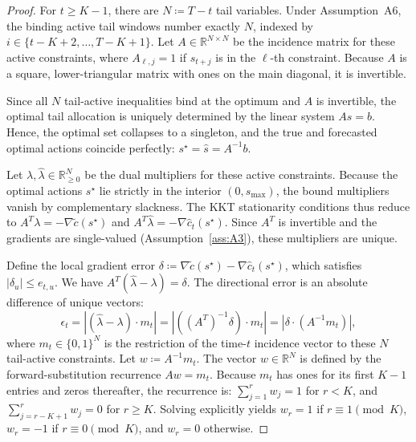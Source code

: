 \documentclass[11pt]{article}
\newcommand{\R}{\mathbb{R}}
\newcommand{\1}{\mathbf{1}}
\newcommand{\eqdef}{\coloneqq}
\newcommand{\modu}[1]{\left|#1\right|}
\begin{document}
\begin{proof}
  For $t \geq K-1$, there are $N \eqdef T-t$ tail variables.
  Under Assumption~A6, the binding active tail windows number exactly $N$, indexed by $i \in \{t-K+2,\dots,T-K+1\}$. Let $A \in \R^{N \times N}$ be the incidence matrix for these active constraints, where $A_{\ell,j} = 1$ if $s_{t+j}$ is in the $\ell$-th constraint.
  Because $A$ is a square, lower-triangular matrix with ones on the main diagonal, it is invertible.

  Since all $N$ tail-active inequalities bind at the optimum and $A$ is invertible, the optimal tail allocation is uniquely determined by the linear system $A s = b$. Hence, the optimal set collapses to a singleton, and the true and forecasted optimal actions coincide perfectly: $s^\star = \hat{s} = A^{-1}b$.

  Let $\lambda, \hat{\lambda} \in \R_{\ge 0}^N$ be the dual multipliers for these active constraints. Because the optimal actions $s^\star$ lie strictly in the interior $(0, s_{\max})$, the bound multipliers vanish by complementary slackness.
  The KKT stationarity conditions thus reduce to $A^T \lambda = -\nabla \tilde{c}(s^{\star})$ and $A^T \hat{\lambda} = -\nabla \hat{c}_{t}(s^{\star})$. Since $A^T$ is invertible and the gradients are single-valued (Assumption~\ref{ass:A3}), these multipliers are unique.

  Define the local gradient error $\delta \eqdef \nabla \tilde{c}(s^{\star}) - \nabla \hat{c}_{t}(s^{\star})$, which satisfies $|\delta_u| \le e_{t,u}$. We have $A^T(\hat{\lambda} - \lambda) = \delta$.
  The directional error is an absolute difference of unique vectors:
  \begin{equation*}
    \epsilon_t = \modu{ (\hat{\lambda} - \lambda) \cdot m_t } = \modu{ ((A^{T})^{-1}\delta) \cdot m_t } = \modu{ \delta \cdot (A^{-1}m_t) },
  \end{equation*}
  where $m_t \in \{0,1\}^N$ is the restriction of the time-$t$ incidence vector to these $N$ tail-active constraints.
  Let $w \eqdef A^{-1}m_t$. The vector $w \in \R^N$ is defined by the forward-substitution recurrence $A w = m_t$.
  Because $m_t$ has ones for its first $K-1$ entries and zeros thereafter, the recurrence is:
  $\sum_{j=1}^{r} w_j = 1$ for $r < K$, and $\sum_{j=r-K+1}^{r} w_j = 0$ for $r \geq K$.
  Solving explicitly yields $w_r = 1$ if $r \equiv 1 \pmod{K}$, $w_r = -1$ if $r \equiv 0 \pmod{K}$, and $w_r = 0$ otherwise.


\end{proof}
\end{document}
